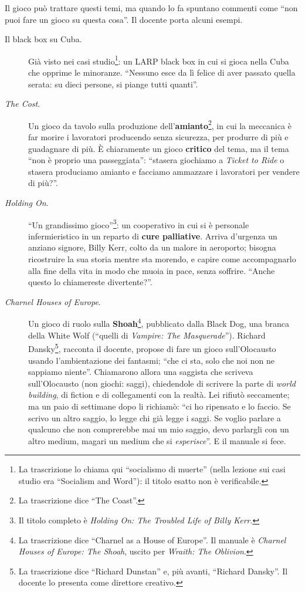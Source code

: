Il gioco può trattare questi temi, ma quando lo fa spuntano commenti come ``non puoi
fare un gioco su questa cosa''. Il docente porta alcuni esempi.
\begin{description}
  \item[Il black box su Cuba.] Già visto nei casi studio\footnote{La trascrizione
        lo chiama qui ``socialismo di muerte'' (nella lezione sui casi studio era
        ``Socialism and Word''): il titolo esatto non è verificabile.}: un LARP
        black box in cui si gioca nella Cuba che opprime le minoranze. ``Nessuno
        esce da lì felice di aver passato quella serata: su dieci persone, si
        piange tutti quanti''.
  \item[\emph{The Cost}.] Un gioco da tavolo sulla produzione
        dell'\textbf{amianto}\footnote{La trascrizione dice ``The Coast''.}, in
        cui la meccanica è far morire i lavoratori producendo senza sicurezza, per
        produrre di più e guadagnare di più. È chiaramente un gioco
        \textbf{critico} del tema, ma il tema ``non è proprio una passeggiata'':
        ``stasera giochiamo a \emph{Ticket to Ride} o stasera produciamo amianto e
        facciamo ammazzare i lavoratori per vendere di più?''.
  \item[\emph{Holding On}.] ``Un grandissimo gioco''\footnote{Il titolo completo è
        \emph{Holding On: The Troubled Life of Billy Kerr}.}: un cooperativo in cui
        si è personale infermieristico in un reparto di \textbf{cure palliative}.
        Arriva d'urgenza un anziano signore, Billy Kerr, colto da un malore in
        aeroporto; bisogna ricostruire la sua storia mentre sta morendo, e capire
        come accompagnarlo alla fine della vita in modo che muoia in pace, senza
        soffrire. ``Anche questo lo chiamereste divertente?''.
  \item[\emph{Charnel Houses of Europe}.] Un gioco di ruolo sulla
        \textbf{Shoah}\footnote{La trascrizione dice ``Charnel as a House of
        Europe''. Il manuale è \emph{Charnel Houses of Europe: The Shoah}, uscito
        per \emph{Wraith: The Oblivion}.}, pubblicato dalla Black Dog, una branca
        della White Wolf (``quelli di \emph{Vampire: The Masquerade}''). Richard
        Dansky\footnote{La trascrizione dice ``Richard Dunstan'' e, più avanti,
        ``Richard Dansky''. Il docente lo presenta come direttore creativo.},
        racconta il docente, propose di fare un gioco sull'Olocausto usando
        l'ambientazione dei fantasmi; ``che ci sta, solo che noi non ne sappiamo
        niente''. Chiamarono allora una saggista che scriveva sull'Olocausto (non
        giochi: saggi), chiedendole di scrivere la parte di \emph{world building},
        di fiction e di collegamenti con la realtà. Lei rifiutò seccamente; ma un
        paio di settimane dopo li richiamò: ``ci ho ripensato e lo faccio. Se scrivo
        un altro saggio, lo legge chi già legge i saggi. Se voglio parlare a
        qualcuno che non comprerebbe mai un mio saggio, devo parlargli con un altro
        medium, magari un medium che si \emph{esperisce}''. E il manuale si fece.
\end{description}

